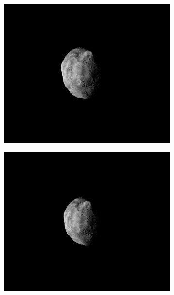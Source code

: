 \begin{figure}[htb]
\begin{subfigure}[b]{0.48\textwidth}
        \caption{}
        \label{fig:composition_before_2}
    \end{subfigure}
    \\
    \begin{subfigure}[b]{0.48\textwidth}
        \centering
        \includegraphics[width=\textwidth]{doc/thesis/0_figures/rendering_lighting/Inst_2017-08-15T115858-281000.png}
        \caption{}
        \label{fig:composition_after_1}
    \end{subfigure}
    \begin{subfigure}[b]{0.48\textwidth}
        \centering
        \includegraphics[width=\textwidth]{doc/thesis/0_figures/rendering_lighting/Inst_2017-08-15T115859-288000.png}

\end{subfigure}
\end{figure}
